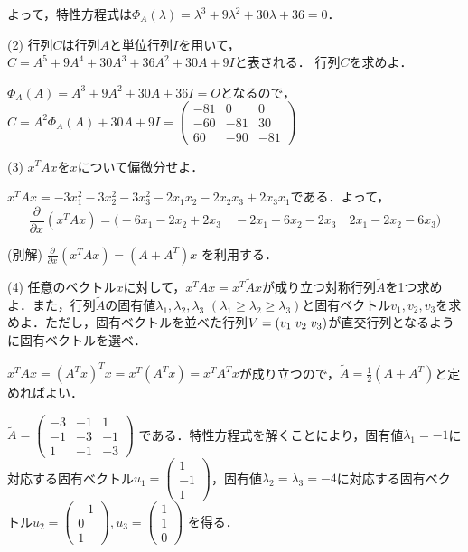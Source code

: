 \documentclass[a4j]{jarticle}
\let \ds \displaystyle
\newcommand{\pdiff}[3]{
  \frac{\partial^{#1} #2}{\partial #3^{#1}}
}
\begin{document}
よって，特性方程式は$\ds \Phi_A(\lambda) = \lambda^3+9\lambda^2+30\lambda+36 = 0$．

\begin{screen}
 (2) 行列$C$は行列$A$と単位行列$I$を用いて，$C=A^5 + 9A^4 + 30 A^3 + 36 A^2 + 30 A + 9 I $と表される． 行列$C$を求めよ．
\end{screen}

$\ds \Phi_A(A) = A^3 + 9A^2 + 30 A + 36 I= O$となるので，$\ds C= A^2 \Phi_A(A) + 30A + 9I =
\begin{pmatrix}
 -81 & 0 & 0 \\
 -60 & -81 & 30 \\
 60 & -90 & -81
\end{pmatrix}$

\begin{screen}
 (3) $x^TAx$を$x$について偏微分せよ．
\end{screen}

$x^TAx = -3x_1^2-3x_2^2-3x_3^2-2x_1x_2-2x_2x_3+2x_3x_1$である．よって，
$$\pdiff{}{}{x}\left(x^TAx\right) = \bigl( -6x_1-2x_2+2x_3 \quad -2x_1-6x_2-2x_3 \quad 2x_1-2x_2-6x_3 \bigr)$$

(別解) $\ds\pdiff{}{}{x}\left(x^TAx\right) = (A+A^T)x$ を利用する．

\begin{screen}
 (4) 任意のベクトル$x$に対して，$x^TAx=x^T\tilde{A}x$が成り立つ対称行列$\tilde{A}$を1つ求めよ．また，行列$\tilde{A}$の固有値$\lambda_1,\lambda_2,\lambda_3$ $(\lambda_1\geq\lambda_2\geq\lambda_3)$と固有ベクトル$v_1,v_2,v_3$を求めよ．ただし，固有ベクトルを並べた行列$V = \left(v_1 \hspace{1mm} v_2 \hspace{1mm} v_3\right)$が直交行列となるように固有ベクトルを選べ．
\end{screen}

$x^TAx = (A^Tx)^Tx = x^T(A^Tx) = x^TA^Tx$が成り立つので，$\ds \tilde{A}=\frac{1}{2}\left(A+A^T\right)$と定めればよい．

$\ds \tilde{A} = \begin{pmatrix} -3 & -1 & 1 \\-1 & -3 & -1 \\1 & -1 & -3\end{pmatrix}$
である．特性方程式を解くことにより，固有値$\lambda_1=-1$に対応する固有ベクトル$u_1=\begin{pmatrix}1 \\ -1 \\ 1\end{pmatrix}$，固有値$\lambda_2=\lambda_3 = -4$に対応する固有ベクトル$u_2=\begin{pmatrix} -1 \\ 0 \\ 1\end{pmatrix},u_3=\begin{pmatrix} 1\\ 1 \\ 0\end{pmatrix}$ を得る．
\end{document}
